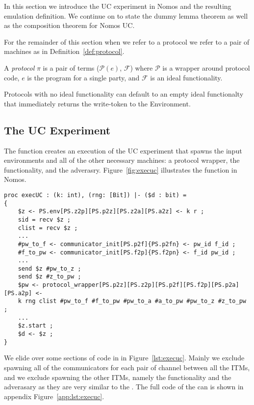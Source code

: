 In this section we introduce the UC experiment in Nomos and the resulting emulation definition.
We continue on to state the dummy lemma theorem as well as the composition theorem for Nomos UC.

For the remainder of this section when we refer to a protocol we refer to a pair of machines as in Definition~\ref{def:protocol}.

\begin{definition}\label{def:protocol}
A \textit{protocol} $\pi$ is a pair of terms ($\mathcal{P}(e)$, $\mathcal{F}$) where $\mathcal{P}$ is a wrapper around protocol code, $e$ is the program for a single party, and $\mathcal{F}$ is an ideal functionality.
\end{definition}
 
Protocols with no ideal functionality can default to an empty ideal functionalty that immediately returns the write-token to the Environment.

\subsection{The UC Experiment}
The  function creates an execution of the UC experiment that spawns the input environments and all of the other necessary machines: a protocol wrapper, the functionality, and the adverasry.
Figure~\ref{fig:execuc} illustrates the function in Nomos.

\begin{figure*}
\begin{lstlisting}[basicstyle=\small\ttfamily]
proc execUC : (k: int), (rng: [Bit]) |- ($d : bit) = 
{
    $z <- PS.env[PS.z2p][PS.p2z][PS.z2a][PS.a2z] <- k r ;
    sid = recv $z ;
    clist = recv $z ;
    ...
    #pw_to_f <- communicator_init[PS.p2f]{PS.p2fn} <- pw_id f_id ;
	#f_to_pw <- communicator_init[PS.f2p]{PS.f2pn} <- f_id pw_id ;
	...
	send $z #pw_to_z ;
	send $z #z_to_pw ;
	$pw <- protocol_wrapper[PS.p2z][PS.z2p][PS.p2f][PS.f2p][PS.p2a][PS.a2p] <-
	k rng clist #pw_to_f #f_to_pw #pw_to_a #a_to_pw #pw_to_z #z_to_pw ;
	...
    $z.start ;
    $d <- $z ;
}
\end{lstlisting}
\caption{The  function spawns all the necessary ITMs in the UC execution: the environment, the protocol wrapper, the functionality, and the adversary. Each is parameterized with a security parameter $k$ and a uniformly random bit string $r \in \{0,1\}^{poly(k)}$. Eventually, the environment is initiated and it returns a bit $b$ which is its guess for which world it is in.}
\label{lst:execuc}
\end{figure*}
We elide over some sections of code in  in Figure~\ref{lst:execuc}.
Mainly we exclude spawning all of the communicators for each pair of channel between all the ITMs, and we exclude spawning the other ITMs, namely the functionality and the adverasary as they are very similar to the .
The full code of the  can is shown in appendix Figure~\ref{app:lst:execuc}.

